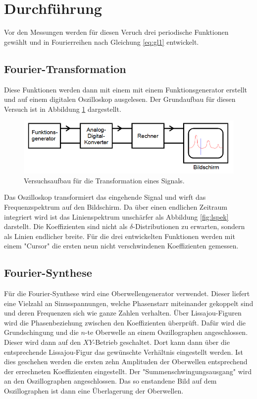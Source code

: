 \section{Durchführung}
\label{sec:Durchführung}
Vor den Messungen werden für diesen Veruch drei periodische Funktionen gewählt und in  Fourierreihen nach Gleichung \eqref{eq:gl1} entwickelt.
\subsection{Fourier-Transformation}
Diese Funktionen werden dann mit einem mit einem Funktionsgenerator erstellt und auf einem digitalen Oszilloskop ausgelesen.
Der Grundaufbau für diesen Versuch ist in Abbildung \ref{fig:aufbau} dargestellt.
\begin{figure}[H]
    \centering
    \caption{Versuchsaufbau für die Transformation eines Signals.\cite{v351}}
    \label{fig:aufbau}
    \includegraphics[width=\textwidth-20em]{content/aufbau.png}
\end{figure}
\noindent
Das Oszilloskop transformiert das eingehende Signal und wirft das Frequenzspektrum auf den Bildschirm.
Da über einen endlichen Zeitraum integriert wird ist das Linienspektrum unschärfer als Abbildung \ref{fig:lspek} darstellt.
Die Koeffizienten sind nicht als $\delta$-Distributionen zu erwarten, sondern als Linien endlicher breite.
Für die drei entwickelten Funktionen werden mit einem "Cursor" die ersten neun nicht verschwindenen Koeffizienten gemessen.
\subsection{Fourier-Synthese}
Für die Fourier-Synthese wird eine Oberwellengenerator verwendet. Dieser liefert eine Vielzahl an Sinusspannungen, welche Phasenstarr miteinander gekoppelt sind und deren Frequenzen sich wie ganze Zahlen verhalten.
Über Lissajou-Figuren wird die Phasenbeziehung zwischen den Koeffizienten überprüft.
Dafür wird die Grundschingung und die $n$-te Oberwelle an einem Oszillographen angeschlossen.
Dieser wird dann auf den $XY$-Betrieb geschaltet.
Dort kann dann über die entsprechende Lissajou-Figur das gewünschte Verhältnis eingestellt werden.
Ist dies geschehen werden die ersten zehn Amplituden der Oberwellen entsprechend der errechneten Koeffizienten eingestellt.
Der "Summenschwingungsausgang" wird an den Oszillographen angeschlossen.
Das so enstandene Bild auf dem Oszillographen ist dann eine Überlagerung der Oberwellen.
